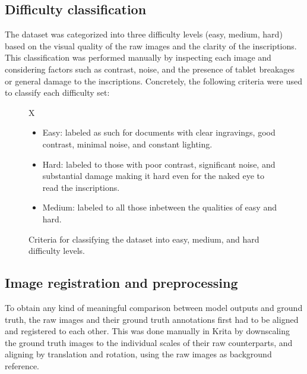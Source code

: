 \subsection{Difficulty classification}
The dataset was categorized into three difficulty levels (easy, medium, hard) based on the visual quality of the raw images and the clarity of the inscriptions.
This classification was performed manually by inspecting each image and considering factors such as contrast, noise, and the presence of tablet breakages or general damage to the inscriptions.
Concretely, the following criteria were used to classify each difficulty set:
\begin{figure}
\centering
X\begin{itemize}
    \item Easy: labeled as such for documents with clear ingravings, good contrast, minimal noise, and constant lighting.
    \item Hard: labeled to those with poor contrast, significant noise, and substantial damage making it hard even for the naked eye to read the inscriptions.
    \item Medium: labeled to all those inbetween the qualities of easy and hard.
\end{itemize}
\caption{Criteria for classifying the dataset into easy, medium, and hard difficulty levels.}
\label{fig:difficulty_criteria}
\end{figure}
\subsection{Image registration and preprocessing}
To obtain any kind of meaningful comparison between model outputs and ground truth, the raw images and their ground truth annotations first had to be aligned and registered to each other.
This was done manually in Krita by downscaling the ground truth images to the individual scales of their raw counterparts, and aligning by translation and rotation, using the raw images as background reference.

